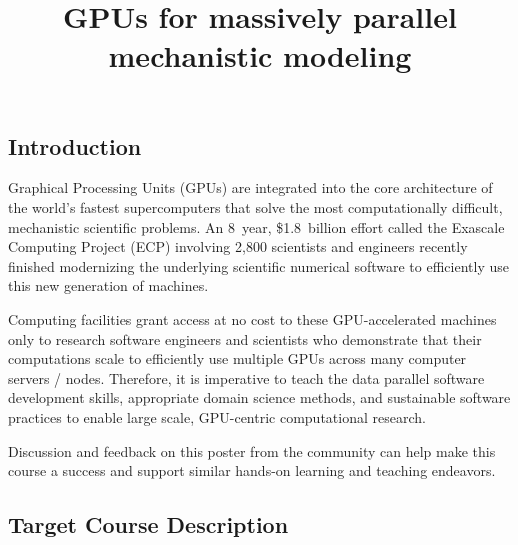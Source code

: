 \documentclass[
portrait,
custom
]{sciposter}
\title{GPUs for massively parallel mechanistic modeling}
\begin{document}
\maketitle

\begin{multicols}{2}

  \section*{Introduction}
  Graphical Processing Units (GPUs) %
  are integrated into the core architecture %
  of the world's fastest supercomputers %
  that solve the most computationally difficult, %
  mechanistic scientific problems.
  An 8~year, \$1.8~billion effort %
  called the Exascale Computing Project (ECP) %
  involving 2,800 scientists and engineers %
  recently finished modernizing %
  the underlying scientific numerical software %
  to efficiently use this new generation of machines.
  \medskip

  Computing facilities grant access at no cost %
  to these GPU-accelerated%
  \supercite{%
    carter_2014,%
    beckingsale_2019,%
    reinders_2023%
  } machines %
  only to research software engineers and scientists who demonstrate that %
  their computations scale %
  to efficiently use multiple GPUs across many computer servers / nodes.
  Therefore, %
  it is imperative to teach %
  the data parallel software development skills, %
  appropriate domain science methods, and %
  sustainable software practices %
  to enable large scale, GPU-centric computational research.
  \medskip

  Discussion and feedback on this poster from the community %
  can help make this course a success and %
  support similar hands-on learning and teaching endeavors.
  \vspace{\baselineskip}


  \subsection*{Target Course Description}


\end{multicols}
\end{document}
